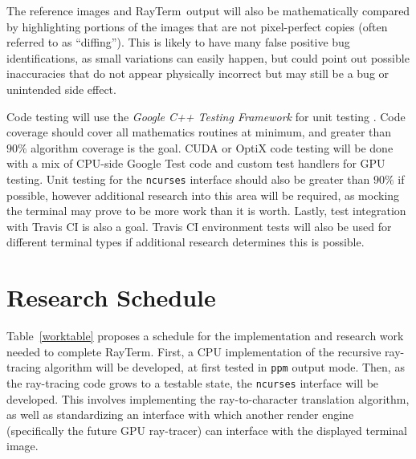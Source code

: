 \documentclass[11pt]{article}
\newcommand{\name}{{\sc RayTerm}}
\begin{document}
The reference images and \name\ output will also be mathematically compared by highlighting portions of the images that are not pixel-perfect copies (often referred to as ``diffing'').
This is likely to have many false positive bug identifications, as small variations can easily happen, but could point out possible inaccuracies that do not appear physically incorrect but may still be a bug or unintended side effect.

Code testing will use the {\it Google C++ Testing Framework} for unit testing \cite{googletest}.
Code coverage should cover all mathematics routines at minimum, and greater than $90\%$ algorithm coverage is the goal.
CUDA or OptiX code testing will be done with a mix of CPU-side Google Test code and custom test handlers for GPU testing.
Unit testing for the \texttt{ncurses} interface should also be greater than $90\%$ if possible, however additional research into this area will be required, as mocking the terminal may prove to be more work than it is worth.
Lastly, test integration with Travis CI is also a goal.
Travis CI environment tests will also be used for different terminal types if additional research determines this is possible.

\section{Research Schedule}
\label{sec:schedule}


Table~\ref{worktable} proposes a schedule for the implementation and research work needed to complete \name.
First, a CPU implementation of the recursive ray-tracing algorithm will be developed, at first tested in \texttt{ppm} output mode.
Then, as the ray-tracing code grows to a testable state, the \texttt{ncurses} interface will be developed.
This involves implementing the ray-to-character translation algorithm, as well as standardizing an interface with which another render engine (specifically the future GPU ray-tracer) can interface with the displayed terminal image.
\end{document}
